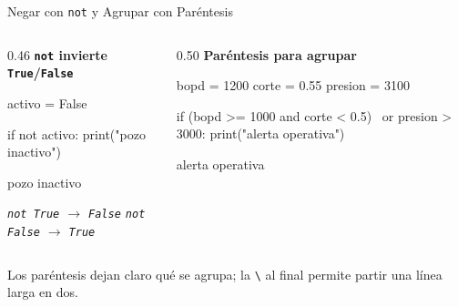\documentclass[aspectratio=169, 11pt]{beamer}
\begin{document}
\begin{frame}[fragile,shrink=12]{Negar con \texttt{not} y Agrupar con Paréntesis}
  \vspace{-4pt}
  \begin{columns}[T]
    \begin{column}{0.46\textwidth}
      {\scriptsize\color{arcaDark}\bfseries \texttt{not} invierte \texttt{True}/\texttt{False}}
      \begin{pyblock}
activo = False

if not activo:
    print("pozo inactivo")
      \end{pyblock}
      \vspace{2pt}
      \begin{outputblock}
pozo inactivo
      \end{outputblock}
      \vspace{3pt}
      {\scriptsize\color{textMuted}\itshape
        \texttt{not True} $\to$ \texttt{False}\quad
        \texttt{not False} $\to$ \texttt{True}}
    \end{column}

    \begin{column}{0.50\textwidth}
      {\scriptsize\color{arcaDark}\bfseries Paréntesis para agrupar}
      \begin{pyblock}
bopd = 1200
corte = 0.55
presion = 3100

if (bopd >= 1000 and corte < 0.5) \
   or presion > 3000:
    print("alerta operativa")
      \end{pyblock}
      \vspace{2pt}
      \begin{outputblock}
alerta operativa
      \end{outputblock}
    \end{column}
  \end{columns}

  \vspace{3pt}
  {\scriptsize\color{textMuted}
    \faLightbulb[regular]\hspace{3pt}%
    Los paréntesis dejan claro qué se agrupa; la \texttt{\textbackslash} al final permite partir una línea larga en dos.}
\end{frame}
\end{document}
